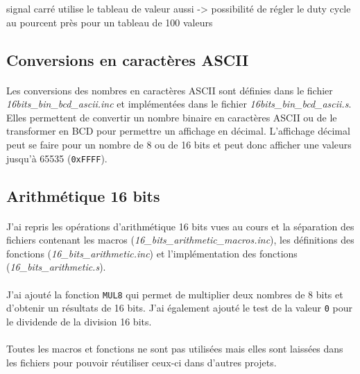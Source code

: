 \documentclass{article}
\begin{document}
    signal carré utilise le tableau de valeur aussi -> possibilité de régler le duty cycle au pourcent près pour un tableau de 100 valeurs


    \subsection{Conversions en caractères ASCII}
    \paragraph{}
    Les conversions des nombres en caractères ASCII sont définies dans le fichier \emph{16bits\_bin\_bcd\_ascii.inc} et implémentées dans le fichier \emph{16bits\_bin\_bcd\_ascii.s}. Elles permettent de convertir un nombre binaire en caractères ASCII ou de le transformer en BCD pour permettre un affichage en décimal. L'affichage décimal peut se faire pour un nombre de 8 ou de 16 bits et peut donc afficher une valeurs jusqu'à 65535 (\texttt{0xFFFF}).

    \subsection{Arithmétique 16 bits}
    \paragraph{}
    J'ai repris les opérations d'arithmétique 16 bits vues au cours et la séparation des fichiers contenant les macros (\emph{16\_bits\_arithmetic\_macros.inc}), les définitions des fonctions (\emph{16\_bits\_arithmetic.inc}) et l'implémentation des fonctions (\emph{16\_bits\_arithmetic.s}).

    \paragraph{}
    J'ai ajouté la fonction \texttt{MUL8} qui permet de multiplier deux nombres de 8 bits et d'obtenir un résultats de 16 bits. J'ai également ajouté le test de la valeur \texttt{0} pour le dividende de la division 16 bits.

    \paragraph{}
    Toutes les macros et fonctions ne sont pas utilisées mais elles sont laissées dans les fichiers pour pouvoir réutiliser ceux-ci dans d'autres projets.
\end{document}
